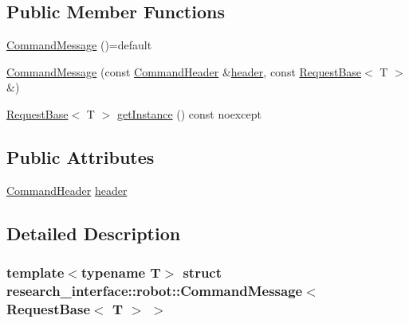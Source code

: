 \subsection*{Public Member Functions}
\begin{DoxyCompactItemize}
\item 
\hyperlink{structresearch__interface_1_1robot_1_1CommandMessage_3_01RequestBase_3_01T_01_4_01_4_a78a300f4b154e68653b80e63ee21d95a}{Command\+Message} ()=default
\item 
\hyperlink{structresearch__interface_1_1robot_1_1CommandMessage_3_01RequestBase_3_01T_01_4_01_4_a21ff989e8efe22145f97015bc9900ce3}{Command\+Message} (const \hyperlink{structresearch__interface_1_1robot_1_1CommandHeader}{Command\+Header} \&\hyperlink{structresearch__interface_1_1robot_1_1CommandMessage_3_01RequestBase_3_01T_01_4_01_4_a67abaf5eb91f48562dadd45a760d0083}{header}, const \hyperlink{structresearch__interface_1_1robot_1_1RequestBase}{Request\+Base}$<$ T $>$ \&)
\item 
\hyperlink{structresearch__interface_1_1robot_1_1RequestBase}{Request\+Base}$<$ T $>$ \hyperlink{structresearch__interface_1_1robot_1_1CommandMessage_3_01RequestBase_3_01T_01_4_01_4_aa2e659e0b90f470edc5bbcba02663c07}{get\+Instance} () const noexcept
\end{DoxyCompactItemize}
\subsection*{Public Attributes}
\begin{DoxyCompactItemize}
\item 
\hyperlink{structresearch__interface_1_1robot_1_1CommandHeader}{Command\+Header} \hyperlink{structresearch__interface_1_1robot_1_1CommandMessage_3_01RequestBase_3_01T_01_4_01_4_a67abaf5eb91f48562dadd45a760d0083}{header}
\end{DoxyCompactItemize}


\subsection{Detailed Description}
\subsubsection*{template$<$typename T$>$\newline
struct research\+\_\+interface\+::robot\+::\+Command\+Message$<$ Request\+Base$<$ T $>$ $>$}




